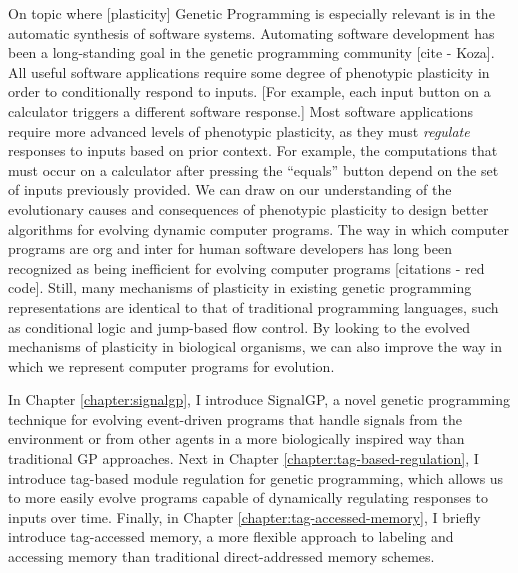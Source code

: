 On topic where [plasticity] Genetic Programming is especially relevant is in the automatic synthesis of software systems.
Automating software development has been a long-standing goal in the genetic programming community [cite - Koza].
All useful software applications require some degree of phenotypic plasticity in order to conditionally respond to inputs.
[For example, each input button on a calculator triggers a different software response.]
Most software applications require more advanced levels of phenotypic plasticity, as they must \textit{regulate} responses to inputs based on prior context.
For example, the computations that must occur on a calculator after pressing the ``equals'' button depend on the set of inputs previously provided.
We can draw on our understanding of the evolutionary causes and consequences of phenotypic plasticity to design better algorithms for evolving dynamic computer programs.
The way in which computer programs are org and inter for human software developers has long been recognized as being inefficient for evolving computer programs [citations - red code].
Still, many mechanisms of plasticity in existing genetic programming representations are identical to that of traditional programming languages, such as conditional logic and jump-based flow control.
By looking to the evolved mechanisms of plasticity in biological organisms, we can also improve the way in which we represent computer programs for evolution. 

In Chapter \ref{chapter:signalgp}, I introduce SignalGP, a novel genetic programming technique for evolving event-driven programs that handle signals from the environment or from other agents in a more biologically inspired way than traditional GP approaches. 
Next in Chapter \ref{chapter:tag-based-regulation}, I introduce tag-based module regulation for genetic programming, which allows us to more easily evolve programs capable of dynamically regulating responses to inputs over time.
Finally, in Chapter \ref{chapter:tag-accessed-memory}, I briefly introduce tag-accessed memory, a more flexible approach to labeling and accessing memory than traditional direct-addressed memory schemes.


